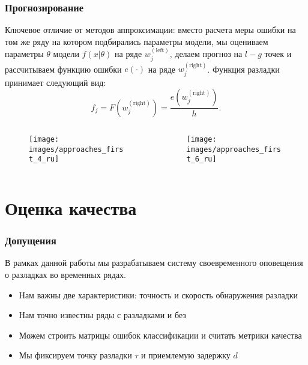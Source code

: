\documentclass[intlimits, 9pt, unicode]{beamer}
\begin{document}
\begin{frame}
    \frametitle{Прогнозирование}


Ключевое отличие от методов аппроксимации: вместо расчета меры ошибки на том же ряду на котором подбирались параметры модели, мы оцениваем параметры $\theta$ модели $f(x|\theta)$ на ряде $ w_j^{\mathrm{(left)}} $, делаем прогноз на $ l - g $ точек и рассчитываем функцию ошибки $ e(\cdot) $ на ряде $ w_j^{\mathrm{(right)}} $. Функция разладки принимает следующий вид:
	\begin{equation*}
	 f_j = F(w_j^{\mathrm{(right)}}) = \frac{e(w_j^{\mathrm{(right)}})}{h}.
	 \end{equation*}

\begin{columns}
    \begin{column}{0.5\textwidth}
	\begin{figure}
	\texttt{[image: images/approaches\_first\_4\_ru]}
	\end{figure}
     \end{column}
    \begin{column}{0.5\textwidth}
	\begin{figure}
	\texttt{[image: images/approaches\_first\_6\_ru]}
	\end{figure}
     \end{column}
     \end{columns}

\end{frame}

\section{Оценка качества}

\begin{frame}
    \frametitle{Допущения}

В рамках данной работы мы разрабатываем систему своевременного оповещения о разладках во временных рядах.

\begin{itemize}
	\item Нам важны две характеристики: точность и скорость обнаружения разладки
	\item Нам точно известны ряды с разладками и без
	\item Можем строить матрицы ошибок классификации и считать метрики качества
	\item Мы фиксируем точку разладки $\tau$ и приемлемую задержку $d$
\end{itemize}

\end{frame}
\end{document}
